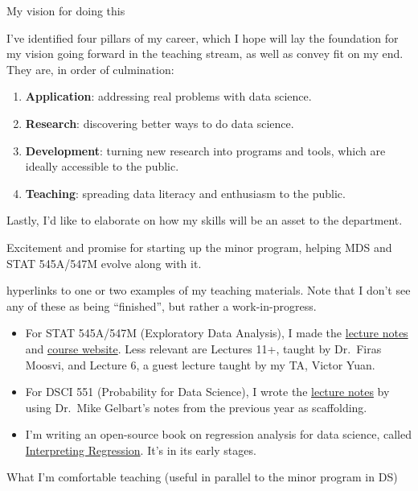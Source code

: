 \documentclass[]{article}
\providecommand{\tightlist}{%
  \setlength{\itemsep}{0pt}\setlength{\parskip}{0pt}}
\begin{document}
My vision for doing this

I've identified four pillars of my career, which I hope will lay the foundation for my vision going forward in the teaching stream, as well as convey fit on my end. They are, in order of culmination:

\begin{enumerate}
\def\labelenumi{\arabic{enumi}.}
\item
  \textbf{Application}: addressing real problems with data science.
\item
  \textbf{Research}: discovering better ways to do data science.
\item
  \textbf{Development}: turning new research into programs and tools, which are ideally accessible to the public.
\item
  \textbf{Teaching}: spreading data literacy and enthusiasm to the public.
\end{enumerate}

Lastly, I'd like to elaborate on how my skills will be an asset to the department.

Excitement and promise for starting up the minor program, helping MDS and STAT 545A/547M evolve along with it.

hyperlinks to one or two examples of my teaching materials. Note that I don't see any of these as being ``finished'', but rather a work-in-progress.

\begin{itemize}
\tightlist
\item
  For STAT 545A/547M (Exploratory Data Analysis), I made the \href{https://stat545guidebook.netlify.com/}{lecture notes} and \href{https://stat545.stat.ubc.ca/}{course website}. Less relevant are Lectures 11+, taught by Dr.~Firas Moosvi, and Lecture 6, a guest lecture taught by my TA, Victor Yuan.
\item
  For DSCI 551 (Probability for Data Science), I wrote the \href{https://ubc-mds.github.io/DSCI_551_stat-prob-dsci/lectures/}{lecture notes} by using Dr.~Mike Gelbart's notes from the previous year as scaffolding.
\item
  I'm writing an open-source book on regression analysis for data science, called \href{https://interpreting-regression.netlify.com/}{Interpreting Regression}. It's in its early stages.
\end{itemize}

What I'm comfortable teaching (useful in parallel to the minor program in DS)
\end{document}
